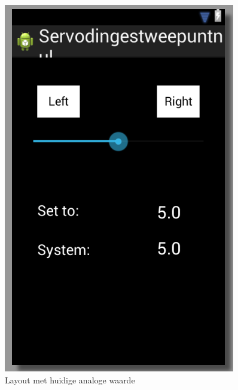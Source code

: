\documentclass[a4paper]{article}
\begin{document}
	\begin{figure}[h]
		\centering
		\includegraphics[scale=0.6]{imgs/layout2.png}
		\caption{Layout met huidige analoge waarde}
		\label{fig:layout2}
	\end{figure}
\end{document}
